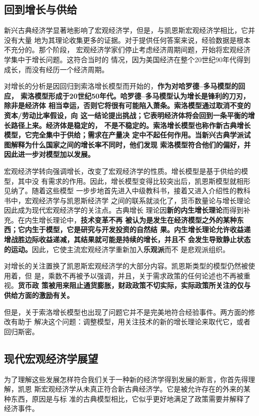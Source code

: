 \subsection{回到增长与供给}

新兴古典经济学显著地影响了宏观经济学，但是，与凯恩斯宏观经济学相比，它并没有大量
地为其理论收集更多的证据。对于提供任何答案来说，经验数据是根本不充分的。那个阶段，
宏观经济学家们停止考虑经济周期间题，开始将宏观经济学集中于增长问题。这符合当时的
情况，因为美国经济在整个20世纪90年代得到成长，而没有经历一个经济周期。

对增长的分析是因回归到索洛增长模型而开始的，\textbf{作为对哈罗德--多马模型的回应，
  索洛模型形成于20世纪50年代。哈罗德--多马模型认为增长是锋利的刀刃，除非是经济体
  相当幸运，否则它将很有可能陷入萧条。索洛模型通过取消不变的资本/劳动比率假设，向
  这一结论提出挑战；它表明经济体将会回到一条平衡的增长路径上来。经济体是稳定的，
  不是不稳定的。索洛增长模型也称作新古典增长模型，它完全集中于供给；需求在产量决
  定中不起任何作用。当新兴古典学派试图解释为什么国家之间的增长率不同时，他们发现
  索洛模型符合他们的偏好，并因此进一步对模型加以发展。}

宏观经济学转向强调增长，改变了宏观经济学的性质。增长模型是基于供给的模型，其中没
有需求的作用。因此，增长模型变得比较突出后，凯恩斯模型就相形见纳了。随着这些模型
一步步地首先进入中级教科书，接着又进入介绍性的教科书中，宏观经济学与凯恩斯经济学
之间的联系就淡化了，货币数量论与增长理论因此成为现代宏观经济学的关注点。古典增长
理论因\textbf{新的内生增长理论}而得到补充。在内生增长理论中，\textbf{技术变革不再
  被认为是发生在经济模型之外的某种东西；它内生于模型，它是研究与开发投资的自然结
  果。内生增长理论允许收益递增战胜边际收益递减，其结果就可能是持续的增长，并且不
  会发生导致静止状态的运动。}因此，它使主流宏观经济学重新加入\textbf{乐观派}而不
是悲观派组织。

对增长的关注置换了凯恩斯宏观经济学的大部分内容。凯恩斯类型的模型仍然被使用着，但
是，乘数不再被予以强调，并且，关于需求政策的任何论述也不再被重视。\textbf{货币政
  策被用来阻止通货膨胀，财政政策不切实际，实际政策所关注的仅与供给方面的激励有关。}

但是，关于索洛增长模型也出现了问题它并不是完美地符合经验事件。两方面的修改有助于
解决这个问题：调整模型，用关注技术的新的增长理论来取代它，或者回归斯密。

\subsection{现代宏观经济学展望}

为了理解这些发展怎样符合我们关于一种新的经济学得到发展的断言，你首先得理解，凯恩
斯宏观经济学从未真正符合新古典经济学。它是被允许存在的外来的某种东西，原因是与标
准的古典模型相比，它似乎更好地满足了政策需要并解释了经济事件。

